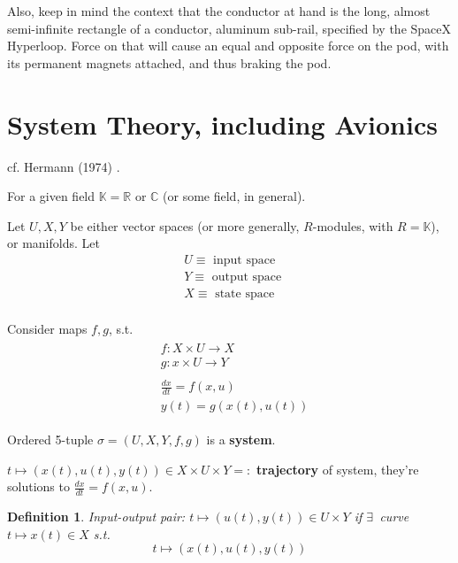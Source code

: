 \documentclass[10pt]{amsart}
\newtheorem{definition}{Definition}
\begin{document}
\begin{multicols*}{2}
Also, keep in mind the context that the conductor at hand is the long, almost semi-infinite rectangle of a conductor, aluminum sub-rail, specified by the SpaceX Hyperloop.  Force on that will cause an equal and opposite force on the pod, with its permanent magnets attached, and thus braking the pod.   

\part{System Theory, including Avionics}

cf. Hermann (1974) \cite{Herm1974}.  

For a given field $\mathbb{K} = \mathbb{R} \text{ or } \mathbb{C}$ (or some field, in general).  

Let $U,X,Y$ be either vector spaces (or more generally, $R$-modules, with $R=\mathbb{K}$), or manifolds.   Let
\[
\begin{aligned}
	& U \equiv \text{ input space } \\
	& Y \equiv \text{ output space } \\
	& X \equiv \text{ state space } \\
\end{aligned}
\]

Consider maps $f,g$, s.t. 
\begin{equation}
	\begin{gathered}
	\begin{aligned} 
& f: X\times U \to X \\
	& g : x \times U \to Y \end{aligned} \\
\begin{aligned}
	& \frac{dx}{dt} = f(x,u) \\ 
	& y(t) = g(x(t),u(t))  
\end{aligned}
\end{gathered}
\end{equation}
 
Ordered 5-tuple $\sigma = (U,X,Y,f,g)$ is a \textbf{system}.  

$t \mapsto (x(t),u(t),y(t)) \in X\times U \times Y =: $ \textbf{trajectory} of system, they're solutions to $\frac{dx}{dt} = f(x,u)$.  

\begin{definition}
	Input-output pair: $t\mapsto (u(t),y(t)) \in U\times Y$ if $\exists \, $ curve $t\mapsto x(t) \in X$ s.t. 
\begin{equation}
t\mapsto (x(t),u(t),y(t))
\end{equation}
\end{definition}


\end{multicols*}
\end{document}
